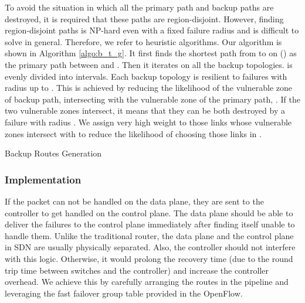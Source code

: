 \documentclass[10pt,journal]{IEEEtran}
\begin{document}
To avoid the situation in which all the primary path and backup paths are destroyed, it is required that these paths are region-disjoint\cite{T13cra}. However, finding region-disjoint paths is NP-hard even with a fixed failure radius  \cite{T13cra} and is difficult to solve in general. Therefore, we refer to heuristic algorithms.
Our algorithm is shown in Algorithm \ref{algo:b_t_g}. It first finds the shortest path  from  to  on  () as the primary path between  and . Then it iterates on all the backup topologies.  is evenly divided into  intervals. Each backup topology  is resilient to failures with radius up to . This is achieved by reducing the likelihood of the vulnerable zone of backup path,  intersecting with the vulnerable zone of the primary path, .
If the two vulnerable zones intersect, it means that they can be both destroyed by a failure with radius . We assign very high weight to those links whose vulnerable zones intersect with  to reduce the likelihood of choosing those links in .

\begin{algorithm}[!ht]
\caption{Backup Routes Generation}
\label{algo:b_t_g}
\end{algorithm}



\subsubsection{Implementation}
If the packet can not be handled on the data plane, they are sent to the controller to get handled on the control plane. The data plane should be able to deliver the failures to the control plane immediately after finding itself unable to handle them. Unlike the traditional router, the data plane and the control plane in SDN are usually physically separated. Also, the controller should not interfere with this logic. Otherwise, it would prolong the recovery time (due to the round trip time between switches and the controller) and increase the controller overhead.
We achieve this by carefully arranging the routes in the pipeline and leveraging the fast failover group table provided in the OpenFlow.
\end{document}
